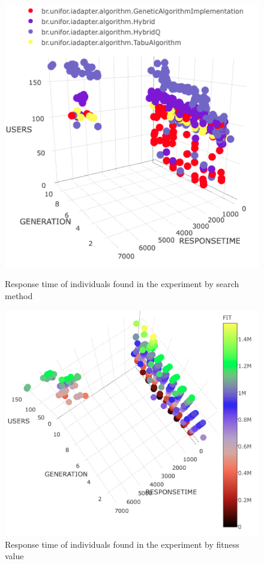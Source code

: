 \documentclass{bmcart}
\begin{document}
\begin{backmatter}
\begin{figure}[h]
\begin{minipage}{.5\textwidth}
\centering
\includegraphics{./images/SearchSurface.png}
\caption{Response time of individuals found in the experiment by search method}
\label{fig:surface}
\end{minipage}
\begin{minipage}{.5\textwidth}
\centering
\includegraphics{./images/searchsurface2.png}
\caption{Response time of individuals found in the experiment by fitness value}
\label{fig:surface2}
\end{minipage}
\end{figure}


\end{backmatter}
\end{document}

